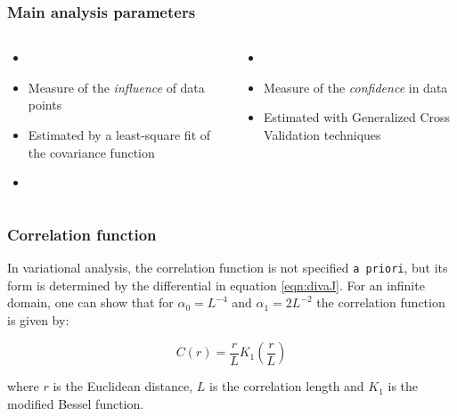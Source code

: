 \begin{frame}
\frametitle{Main analysis parameters}

\begin{columns}[totalwidth=\textwidth]

\begin{itemize}
\footnotesize
\item[]
\item Measure of the \textit{influence} of data points
\item Estimated by a least-square fit of the covariance function
\item[]
\end{itemize}


\begin{itemize}
\footnotesize
\item[]
\item Measure of the \textit{confidence} in data 
\item Estimated with Generalized Cross Validation techniques
\end{itemize}


\end{columns}
\end{frame}

\begin{frame}
\frametitle{Correlation function}

In variational analysis, the correlation function is not specified
\texttt{a priori}, but its form is determined by the differential in
equation \eqref{eqn:divaJ}. For an infinite domain, one can show that
for $\alpha_0 = L^{-4}$ and $\alpha_1 = 2 L^{-2}$ 
the correlation function is given by: %

\begin{equation}
C(r) = \frac{r}{L} K_1 \left(\frac{r}{L}\right)
\end{equation}

where $r$ is the Euclidean distance, $L$ is the correlation length and
$K_1$ is the modified Bessel function. %

\end{frame}


